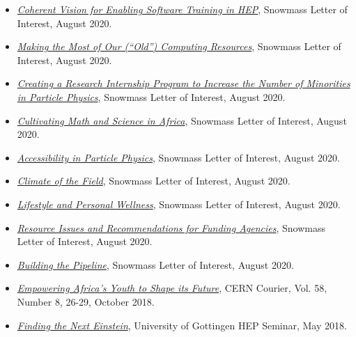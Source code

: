 \documentclass[10pt]{article}
\begin{document}
\begin{itemize}
\item \href{https://www.snowmass21.org/docs/files/summaries/CommF/SNOWMASS21-CommF4_CommF0-CompF0_CompF0_Samuel_Meehan-030.pdf}{\textit{Coherent Vision for Enabling Software Training in HEP}}, Snowmass Letter of Interest, August 2020.

\item \href{https://www.snowmass21.org/docs/files/summaries/CompF/SNOWMASS21-CompF0_CompF0-CommF3_CommF0_Samuel_Meehan-033.pdf}{\textit{Making the Most of Our (“Old”) Computing Resources}}, Snowmass Letter of Interest, August 2020.

\item \href{https://www.snowmass21.org/docs/files/summaries/CommF/SNOWMASS21-CommF2_CommF3_Samuel_Meehan-031.pdf}{\textit{Creating a Research Internship Program to Increase the Number of Minorities in Particle Physics}}, Snowmass Letter of Interest, August 2020.

\item \href{https://www.snowmass21.org/docs/files/summaries/CommF/SNOWMASS21-CommF3_CommF0-TF0_TF0-AF0_AF0_Samuel_Meehan-028.pdf}{\textit{Cultivating Math and Science in Africa}}, Snowmass Letter of Interest, August 2020.

\item \href{https://www.snowmass21.org/docs/files/summaries/CommF/SNOWMASS21-CommF3_CommF6_Samuel_Meehan-074.pdf}{\textit{Accessibility in Particle Physics}}, Snowmass Letter of Interest, August 2020.

\item \href{https://www.snowmass21.org/docs/files/summaries/CommF/SNOWMASS21-CommF3_CommF0_Samuel_Meehan-077.pdf}{\textit{Climate of the Field}}, Snowmass Letter of Interest, August 2020.

\item \href{https://www.snowmass21.org/docs/files/summaries/CommF/SNOWMASS21-CommF3_CommF0_Samuel_Meehan-079.pdf}{\textit{Lifestyle and Personal Wellness}}, Snowmass Letter of Interest, August 2020.

\item \href{https://www.snowmass21.org/docs/files/summaries/CommF/SNOWMASS21-CommF6_CommF3_Samuel_Meehan-081.pdf}{\textit{Resource Issues and Recommendations for Funding Agencies}}, Snowmass Letter of Interest, August 2020.

\item \href{https://www.snowmass21.org/docs/files/summaries/CommF/SNOWMASS21-CommF2_CommF3_Samuel_Meehan-076.pdf}{\textit{Building the Pipeline}}, Snowmass Letter of Interest, August 2020.

\item \href{http://iopp.fileburst.com/ccr/archive/CERNCourier2018Oct-digitaledition.pdf}{\textit{Empowering Africa's Youth to Shape its Future}}, CERN Courier, Vol. 58, Number 8, 26-29, October 2018.

\item \href{https://indico.cern.ch/event/724559/}{\textit{Finding the Next Einstein}}, University of Gottingen HEP Seminar, May 2018.
\end{itemize}
\end{document}
